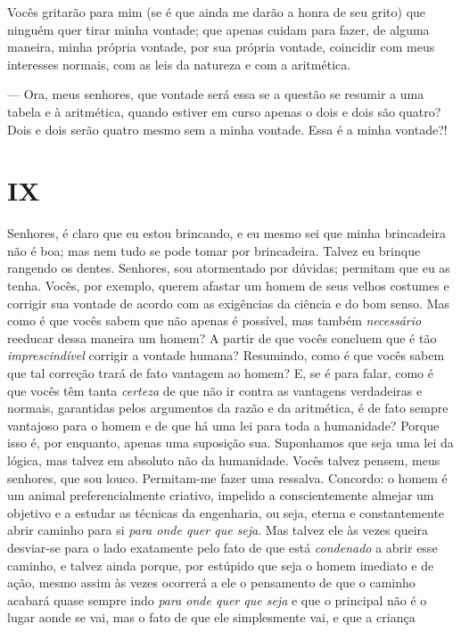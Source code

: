 Vocês gritarão para mim (se é que ainda me darão a honra de seu grito)
que ninguém quer tirar minha vontade; que apenas cuidam para fazer, de
alguma maneira, minha própria vontade, por sua própria vontade,
coincidir com meus interesses normais, com as leis da natureza e com a
aritmética.

--- Ora, meus senhores, que vontade será essa se a questão se resumir a
uma tabela e à aritmética, quando estiver em curso apenas o dois e dois
são quatro? Dois e dois serão quatro mesmo sem a minha vontade. Essa é
a minha vontade?!


\section{IX}

Senhores, é claro que eu estou brincando, e eu mesmo sei que minha brincadeira
não é boa; mas nem tudo se pode tomar por brincadeira.  Talvez eu brinque
rangendo os dentes. Senhores, sou atormentado por dúvidas; permitam que eu as
tenha. Vocês, por exemplo, querem afastar um homem de seus velhos costumes e
corrigir sua vontade de acordo com as exigências da ciência e do bom senso. Mas
como é que vocês sabem que não apenas é possível, mas também
\textit{necessário} reeducar dessa maneira um homem? A partir de que vocês
concluem que é tão \textit{imprescindível} corrigir a vontade humana?
Resumindo, como é que vocês sabem que tal correção trará de fato vantagem ao
homem? E, se é para falar, como é que vocês têm tanta \textit{certeza} de que
não ir contra as vantagens verdadeiras e normais, garantidas pelos argumentos
da razão e da aritmética, é de fato sempre vantajoso para o homem e de que há
uma lei para toda a humanidade? Porque isso é, por enquanto, apenas uma
suposição sua. Suponhamos que seja uma lei da lógica, mas talvez em absoluto
não da humanidade. Vocês talvez pensem, meus senhores, que sou louco.
Permitam-me fazer uma ressalva. Concordo: o homem é um animal preferencialmente
criativo, impelido a conscientemente almejar um objetivo e a estudar as
técnicas da engenharia, ou seja, eterna e constantemente abrir caminho para si
\textit{para onde quer que seja}. Mas talvez ele às vezes queira desviar-se
para o lado exatamente pelo fato de que está \textit{condenado} a abrir esse
caminho, e talvez ainda porque, por estúpido que seja o homem imediato e de
ação, mesmo assim às vezes ocorrerá a ele o pensamento de que o caminho acabará
quase sempre indo \textit{para onde quer que seja} e que o principal não é o
lugar aonde se vai, mas o fato de que ele simplesmente vai, e que a criança
